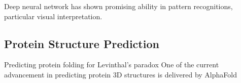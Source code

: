 Deep neural network has shown promising ability in pattern recognitions, particular visual interpretation.
\par 

\subsection{Protein Structure Prediction}
Predicting protein folding for  Levinthal's paradox One of the current advancement in predicting protein 3D structures is delivered by AlphaFold